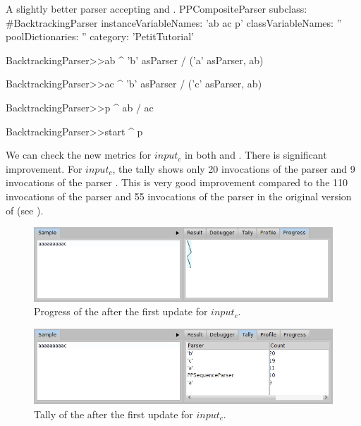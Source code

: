 \documentclass[a4paper,10pt,twoside]{book}
\begin{document}
\begin{script}{A slightly better parser accepting  and . \label{scr:pp/backtrackingParser-update-1}}
PPCompositeParser subclass: #BacktrackingParser
	instanceVariableNames: 'ab ac p'
	classVariableNames: ''
	poolDictionaries: ''
	category: 'PetitTutorial'

BacktrackingParser>>ab
  ^  'b' asParser / 
     ('a' asParser, ab)

BacktrackingParser>>ac
  ^  'b' asParser / 
     ('c' asParser, ab)

BacktrackingParser>>p 
  ^ ab / ac

BacktrackingParser>>start 
  ^ p
\end{script}

We can check the new metrics for $input_c$ in both  and . There is significant improvement.
For $input_c$, the tally shows only 20 invocations of the parser  and 9 invocations of the parser .
This is very good improvement compared to the 110 invocations of the parser  and 55 invocations of the parser  in the original version of  (see ).

\begin{figure}
  \begin{center}
    \includegraphics[width=\linewidth]{example-progressAaac-update-1}
    \caption{Progress of the  after the first update for $input_c$. \label{fig:pp/example-progressAaac-update-1}}
  \end{center}
\end{figure}

\begin{figure}
  \begin{center}
    \includegraphics[width=\linewidth]{example-tallyAaac-update-1}
    \caption{Tally of the  after the first update for $input_c$. \label{fig:pp/example-tallyAaac-update-1}}
  \end{center}
\end{figure}
\end{document}
